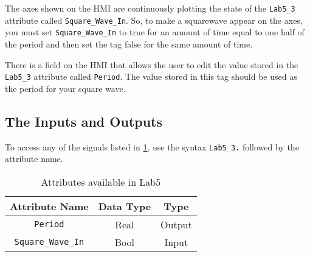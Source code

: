 The axes shown on the HMI are continuously plotting the state of the \verb|Lab5_3| attribute called \verb|Square_Wave_In|. So, to make a squarewave appear on the axes, you must set \verb|Square_Wave_In| to true for an amount of time equal to one half of the period and then set the tag false for the same amount of time.

There is a field on the HMI that allows the user to edit the value stored in the \verb|Lab5_3| attribute called \verb|Period|. The value stored in this tag should be used as the period for your square wave.

\subsection{The Inputs and Outputs}

To access any of the signals listed in \tableautorefname \ref{Table:Lab5_3Attributes}, use the syntax \verb|Lab5_3.| followed by the attribute name. 

\begin{table}[h]
\centering
\caption{Attributes available in Lab5}
\label{Table:Lab5_3Attributes}
\begin{tabular}{c c c}
\toprule
Attribute Name & Data Type & Type\\
\midrule
\verb|Period| & Real & Output \\
\midrule
\verb|Square_Wave_In| & Bool & Input\\
\bottomrule
\end{tabular}
\end{table}

\TASignatureSlot


